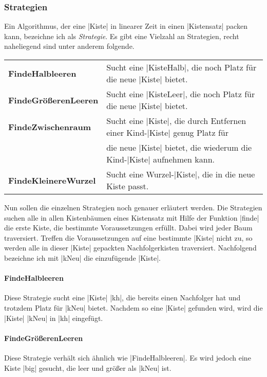 \subsubsection{Strategien}
\label{strats}
 Ein Algorithmus, der eine |Kiste| in linearer Zeit in einen |Kistensatz| packen kann, bezeichne ich als \emph{Strategie}.
 Es gibt eine Vielzahl an Strategien, recht naheliegend sind unter anderem folgende.

\begin{center}
\begin{tabular}{ll}
 \textbf{FindeHalbleeren}    & Sucht eine |KisteHalb|, die noch Platz für die neue |Kiste| bietet. \\
 \textbf{FindeGrößerenLeeren} & Sucht eine |KisteLeer|, die noch Platz für die neue |Kiste| bietet. \\
 \textbf{FindeZwischenraum}  & Sucht eine |Kiste|, die durch Entfernen einer Kind-|Kiste| genug Platz für \\
                             & die neue |Kiste| bietet, die wiederum die Kind-|Kiste| aufnehmen kann. \\
 \textbf{FindeKleinereWurzel}& Sucht eine Wurzel-|Kiste|, die in die neue Kiste passt.      \\
\end{tabular}
\end{center}

 Nun sollen die einzelnen Strategien noch genauer erläutert werden.
 Die Strategien suchen alle in allen Kistenbäumen eines Kistensatz mit Hilfe der Funktion |finde| die erste Kiste,
  die bestimmte Voraussetzungen erfüllt.
 Dabei wird jeder Baum traversiert. Treffen die Voraussetzungen auf eine bestimmte |Kiste| nicht zu,
  so werden alle in dieser |Kiste| gepackten Nachfolgerkisten traversiert.
 Nachfolgend bezeichne ich mit |kNeu| die einzufügende |Kiste|.
\paragraph{FindeHalbleeren}
 Diese Strategie sucht eine |Kiste| |kh|, die bereits einen Nachfolger hat und trotzdem Platz für |kNeu| bietet.
 Nachdem so eine |Kiste| gefunden wird, wird die |Kiste| |kNeu| in |kh| eingefügt.
\paragraph{FindeGrößerenLeeren}
 Diese Strategie verhält sich ähnlich wie |FindeHalbleeren|. Es wird jedoch eine Kiste |big| gesucht, die leer und größer als |kNeu| ist.
